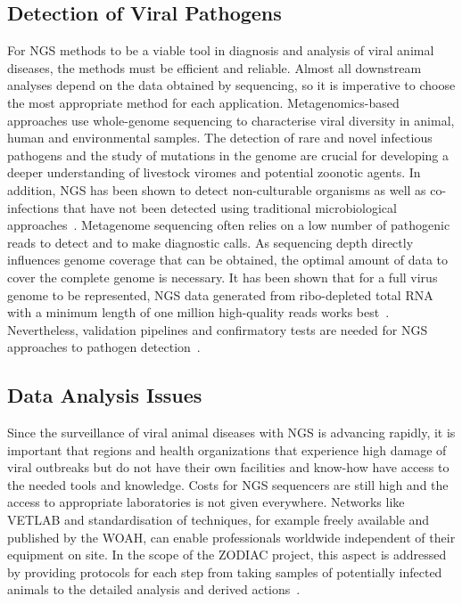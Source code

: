 \subsection{Detection of Viral Pathogens}
For NGS methods to be a viable tool in diagnosis and analysis of viral animal diseases, the methods must be efficient and reliable. Almost all downstream analyses depend on the data obtained by sequencing, so it is imperative to choose the most appropriate method for each application. Metagenomics-based approaches use whole-genome sequencing to characterise viral diversity in animal, human and environmental samples. The detection of rare and novel infectious pathogens and the study of mutations in the genome are crucial for developing a deeper understanding of livestock viromes and potential zoonotic agents. In addition, NGS has been shown to detect non-culturable organisms as well as co-infections that have not been detected using traditional microbiological approaches~\cite{cantalupo2019detecting}. Metagenome sequencing often relies on a low number of pathogenic reads to detect and to make diagnostic calls. As sequencing depth directly influences genome coverage that can be obtained, the optimal amount of data to cover the complete genome is necessary. It has been shown that for a full virus genome to be represented, NGS data generated from ribo-depleted total RNA with a minimum length of one million high-quality reads works best~\cite{visser2016next}. Nevertheless, validation pipelines and confirmatory tests are needed for NGS approaches to pathogen detection~\cite{minogue2019next}.

\subsection{Data Analysis Issues}
Since the surveillance of viral animal diseases with NGS is advancing rapidly, it is important that regions and health organizations that experience high damage of viral outbreaks but do not have their own facilities and know-how have access to the needed tools and knowledge. Costs for NGS sequencers are still high and the access to appropriate laboratories is not given everywhere. Networks like VETLAB and standardisation of techniques, for example freely available and published by the WOAH, can enable professionals worldwide independent of their equipment on site. In the scope of the ZODIAC project, this aspect is addressed by providing protocols for each step from taking samples of potentially infected animals to the detailed analysis and derived actions~\cite{zodiac2021}.

